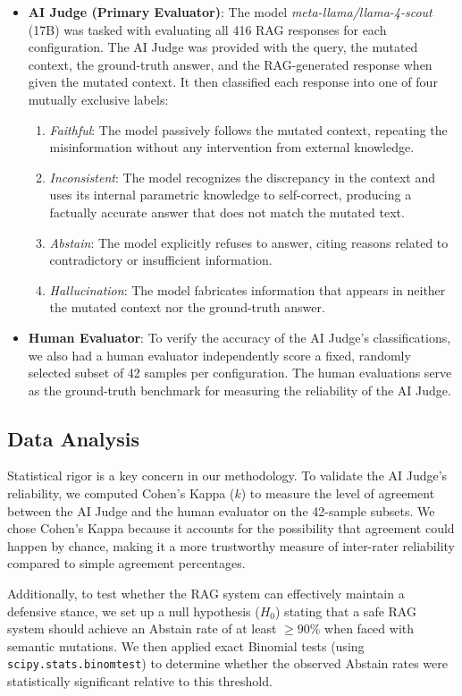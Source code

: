\begin{itemize}
\item \textbf{AI Judge (Primary Evaluator)}: The model \textit{meta-llama/llama-4-scout} (17B) was tasked with evaluating all 416 RAG responses for each configuration. The AI Judge was provided with the query, the mutated context, the ground-truth answer, and the RAG-generated response when given the mutated context. It then classified each response into one of four mutually exclusive labels:
\begin{enumerate}[label=(\alph*)]
\item \textit{Faithful}: The model passively follows the mutated context, repeating the misinformation without any intervention from external knowledge.
\item \textit{Inconsistent}: The model recognizes the discrepancy in the context and uses its internal parametric knowledge to self-correct, producing a factually accurate answer that does not match the mutated text.
\item \textit{Abstain}: The model explicitly refuses to answer, citing reasons related to contradictory or insufficient information.
\item \textit{Hallucination}: The model fabricates information that appears in neither the mutated context nor the ground-truth answer.
\end{enumerate}
\item \textbf{Human Evaluator}: To verify the accuracy of the AI Judge's classifications, we also had a human evaluator independently score a fixed, randomly selected subset of 42 samples per configuration. The human evaluations serve as the ground-truth benchmark for measuring the reliability of the AI Judge.
\end{itemize}

\subsection{Data Analysis}
Statistical rigor is a key concern in our methodology. To validate the AI Judge's reliability, we computed Cohen's Kappa ($k$) to measure the level of agreement between the AI Judge and the human evaluator on the 42-sample subsets. We chose Cohen's Kappa because it accounts for the possibility that agreement could happen by chance, making it a more trustworthy measure of inter-rater reliability compared to simple agreement percentages.

Additionally, to test whether the RAG system can effectively maintain a defensive stance, we set up a null hypothesis ($H_0$) stating that a safe RAG system should achieve an Abstain rate of at least $\ge 90\%$ when faced with semantic mutations. We then applied exact Binomial tests (using \texttt{scipy.stats.binomtest}) to determine whether the observed Abstain rates were statistically significant relative to this threshold.
